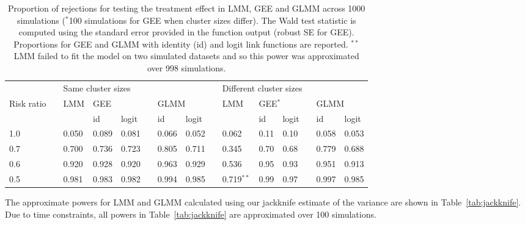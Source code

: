 \documentclass[10pt]{article}
\begin{document}
\begin{table}[H]
\centering
\begin{tabular}{@{}lclllcllclllcll@{}}
\toprule
 && \multicolumn{6}{l}{Same cluster sizes} && \multicolumn{6}{l}{Different cluster sizes} \\
\cmidrule{3-8}\cmidrule{10-15}
\multirow{2}{*}{\parbox{0.75cm}{Risk ratio}} & & LMM & \multicolumn{2}{l}{GEE} && \multicolumn{2}{l}{GLMM} && LMM & \multicolumn{2}{l}{GEE$^*$} && \multicolumn{2}{l}{GLMM} \\
\cmidrule{4-5}\cmidrule{7-8}\cmidrule{11-12}\cmidrule{14-15}
 & & & id & logit && id & logit && & id & logit && id & logit \\
\midrule
1.0 &&  0.050 & 0.089 & 0.081 && 0.066 & 0.052 && 0.062 & 0.11 & 0.10 && 0.058 & 0.053 \\
0.7 && 0.700 & 0.736 & 0.723 && 0.805 & 0.711 && 0.345 & 0.70 & 0.68 && 0.779 & 0.688 \\
0.6 && 0.920 & 0.928 & 0.920 && 0.963 & 0.929 && 0.536 & 0.95 & 0.93 && 0.951 & 0.913 \\
0.5 && 0.981 & 0.983 & 0.982 && 0.994 & 0.985 && 0.719$^{**}$ & 0.99 & 0.97 && 0.997 & 0.985 \\
\bottomrule
\end{tabular}
\caption{Proportion of rejections for testing the treatment effect in LMM, GEE and GLMM across 1000 simulations ($^*$100 simulations for GEE when cluster sizes differ). The Wald test statistic is computed using the standard error provided in the function output (robust SE for GEE). Proportions for GEE and GLMM with identity (id) and logit link functions are reported. $^{**}$LMM failed to fit the model on two simulated datasets and so this power was approximated over 998 simulations.}
\label{tab:simulation}
\end{table}

The approximate powers for LMM and GLMM calculated using our jackknife estimate of the variance are shown in Table~\ref{tab:jackknife}. Due to time constraints, all powers in Table~\ref{tab:jackknife} are approximated over 100 simulations.
\end{document}
